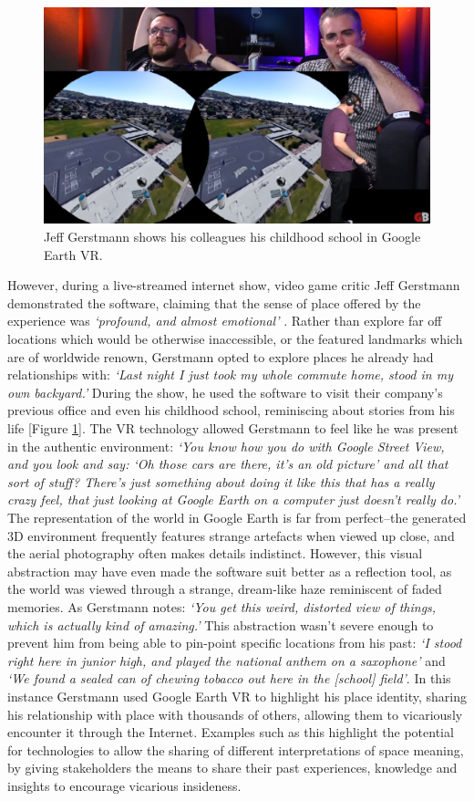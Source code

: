 \begin{figure}
  \centering
  \includegraphics[width=0.8\columnwidth]{images/chapter02/googleEarth.PNG}
  \caption{Jeff Gerstmann shows his colleagues his childhood school in Google Earth VR.}
  \label{fig:googleEarth}
\end{figure}

However, during a live-streamed internet show, video game critic Jeff Gerstmann demonstrated the software, claiming that the sense of place offered by the experience was \textit{`profound, and almost emotional'} \citep{Gerstmann2016}. Rather than explore far off locations which would be otherwise inaccessible, or the featured landmarks which are of worldwide renown, Gerstmann opted to explore places he already had relationships with: \textit{`Last night I just took my whole commute home, stood in my own backyard.'} During the show, he used the software to visit their company's previous office and even his childhood school, reminiscing about stories from his life [Figure \ref{fig:googleEarth}]. The VR technology allowed Gerstmann to feel like he was present in the authentic environment: \textit{`You know how you do with Google Street View, and you look and say: `Oh those cars are there, it's an old picture' and all that sort of stuff? There's just something about doing it like this that has a really crazy feel, that just looking at Google Earth on a computer just doesn't really do.'} The representation of the world in Google Earth is far from perfect--the generated 3D environment frequently features strange artefacts when viewed up close, and the aerial photography often makes details indistinct. However, this visual abstraction may have even made the software suit better as a reflection tool, as the world was viewed through a strange, dream-like haze reminiscent of faded memories. As Gerstmann notes: \textit{`You get this weird, distorted view of things, which is actually kind of amazing.'} This abstraction wasn't severe enough to prevent him from being able to pin-point specific locations from his past: \textit{`I stood right here in junior high, and played the national anthem on a saxophone'} and \textit{`We found a sealed can of chewing tobacco out here in the [school] field'}. In this instance Gerstmann used Google Earth VR to highlight his place identity, sharing his relationship with place with thousands of others, allowing them to vicariously encounter it through the Internet. Examples such as this highlight the potential for technologies to allow the sharing of different interpretations of space meaning, by giving stakeholders the means to share their past experiences, knowledge and insights to encourage vicarious insideness.

